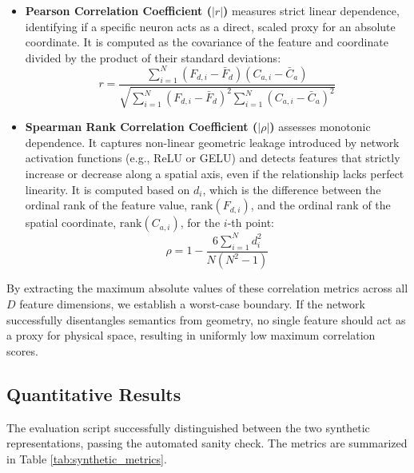 \documentclass[11pt, a4paper]{article}
\begin{document}
\begin{itemize}
    \item \textbf{Pearson Correlation Coefficient ($|r|$)} measures strict linear dependence, identifying if a specific neuron acts as a direct, scaled proxy for an absolute coordinate. It is computed as the covariance of the feature and coordinate divided by the product of their standard deviations:
    $$ r = \frac{\sum_{i=1}^{N} (F_{d,i} - \bar{F}_d)(C_{a,i} - \bar{C}_a)}{\sqrt{\sum_{i=1}^{N} (F_{d,i} - \bar{F}_d)^2 \sum_{i=1}^{N} (C_{a,i} - \bar{C}_a)^2}} $$
    
    \item \textbf{Spearman Rank Correlation Coefficient ($|\rho|$)} assesses monotonic dependence. It captures non-linear geometric leakage introduced by network activation functions (e.g., ReLU or GELU) and detects features that strictly increase or decrease along a spatial axis, even if the relationship lacks perfect linearity. It is computed based on $d_i$, which is the difference between the ordinal rank of the feature value, $\text{rank}(F_{d,i})$, and the ordinal rank of the spatial coordinate, $\text{rank}(C_{a,i})$, for the $i$-th point:
    $$ \rho = 1 - \frac{6 \sum_{i=1}^{N} d_i^2}{N(N^2 - 1)} $$
\end{itemize}

By extracting the maximum absolute values of these correlation metrics across all $D$ feature dimensions, we establish a worst-case boundary. If the network successfully disentangles semantics from geometry, no single feature should act as a proxy for physical space, resulting in uniformly low maximum correlation scores.

\subsection{Quantitative Results}
The evaluation script successfully distinguished between the two synthetic representations, passing the automated sanity check. The metrics are summarized in Table \ref{tab:synthetic_metrics}.
\end{document}
